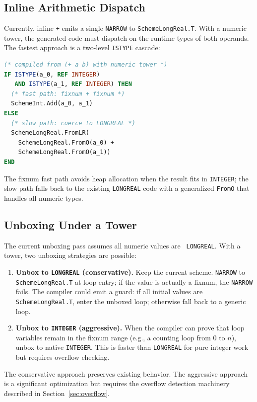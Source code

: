 \documentclass[12pt]{report}
\begin{document}
\subsection{Inline Arithmetic Dispatch}

Currently, inline {\tt +} emits a single {\tt NARROW} to
{\tt SchemeLongReal.T}.  With a numeric tower, the generated code
must dispatch on the runtime types of both operands.  The fastest
approach is a two-level {\tt ISTYPE} cascade:

\begin{lstlisting}[language=Modula3]
(* compiled from (+ a b) with numeric tower *)
IF ISTYPE(a_0, REF INTEGER)
   AND ISTYPE(a_1, REF INTEGER) THEN
  (* fast path: fixnum + fixnum *)
  SchemeInt.Add(a_0, a_1)
ELSE
  (* slow path: coerce to LONGREAL *)
  SchemeLongReal.FromLR(
    SchemeLongReal.FromO(a_0) +
    SchemeLongReal.FromO(a_1))
END
\end{lstlisting}

\noindent The fixnum fast path avoids heap allocation when the result
fits in {\tt INTEGER}; the slow path falls back to the existing
{\tt LONGREAL} code with a generalized {\tt FromO} that handles all
numeric types.

\subsection{Unboxing Under a Tower}

The current unboxing pass assumes all numeric values are {\tt
LONGREAL}.  With a tower, two unboxing strategies are possible:

\begin{enumerate}
\item \textbf{Unbox to {\tt LONGREAL} (conservative).}
  Keep the current scheme.  {\tt NARROW} to {\tt SchemeLongReal.T}
  at loop entry; if the value is actually a fixnum, the {\tt NARROW}
  fails.  The compiler could emit a guard: if all initial values are
  {\tt SchemeLongReal.T}, enter the unboxed loop; otherwise fall back
  to a generic loop.

\item \textbf{Unbox to {\tt INTEGER} (aggressive).}
  When the compiler can prove that loop variables remain in the
  fixnum range (e.g., a counting loop from 0 to $n$), unbox to
  native {\tt INTEGER}.  This is faster than {\tt LONGREAL} for
  pure integer work but requires overflow checking.
\end{enumerate}

The conservative approach preserves existing behavior.  The aggressive
approach is a significant optimization but requires the overflow
detection machinery described in Section~\ref{sec:overflow}.
\end{document}
